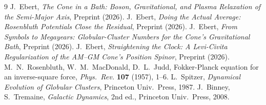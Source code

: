 \documentclass[12pt]{amsart}
\theoremstyle{plain}
\theoremstyle{remark}
\begin{document}
\begin{thebibliography}{9}
 J.~Ebert, \emph{The Cone in a Bath: Boson, Gravitational, and Plasma Relaxation of the Semi-Major Axis}, Preprint (2026).
 J.~Ebert, \emph{Doing the Actual Average: Rosenbluth Potentials Close the Residual}, Preprint (2026).
 J.~Ebert, \emph{From Symbols to Megayears: Globular-Cluster Numbers for the Cone's Gravitational Bath}, Preprint (2026).
 J.~Ebert, \emph{Straightening the Clock: A Levi-Civita Regularization of the AM--GM Cone's Position Spinor}, Preprint (2026).
 M.~N.~Rosenbluth, W.~M.~MacDonald, D.~L.~Judd, Fokker-Planck equation for an inverse-square force, \emph{Phys.\ Rev.} \textbf{107} (1957), 1--6.
 L.~Spitzer, \emph{Dynamical Evolution of Globular Clusters}, Princeton Univ.\ Press, 1987.
 J.~Binney, S.~Tremaine, \emph{Galactic Dynamics}, 2nd ed., Princeton Univ.\ Press, 2008.
\end{thebibliography}
\end{document}
